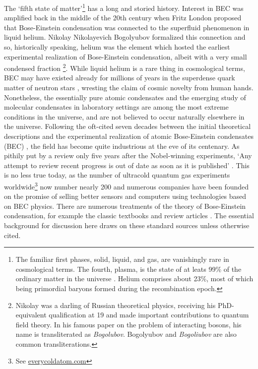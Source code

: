 	The `fifth state of matter'\footnote{The familiar first phases, solid, liquid, and gas, are vanishingly rare in cosmological terms.
	The fourth, plasma, is the state of at leats 99\% of the ordinary matter in the universe \cite{Plasmastuff}.
	Helium comprises about 23\%, most of which being primordial baryons formed during the recombination epoch.}  has a long and storied history\cite{Mukundanote}.
	Interest in BEC was amplified back in the middle of the 20th century when Fritz London proposed that Bose-Einstein condensation was connected to the superfluid phenomenon in liquid helium.
	Nikolay Nikolayevich Bogolyubov formalized this connection and so, historically speaking, helium was the element which hosted the earliest experimental realization of Bose-Einstein condensation, albeit with a very small condensed fraction \footnote{Nikolay was a darling of Russian theoretical physics, receiving his PhD-equivalent qualification at 19 and made important contributions to quantum field theory. In his famous paper on the problem of interacting bosons, his name is transliterated as \emph{Bogolubov}. Bogolyubov and \emph{Bogoliubov} are also common transliterations.}.
	While liquid helium is a rare thing in cosmological terms, BEC may have existed already for millions of years in the superdense quark matter of neutron stars \cite{Haskell18, Martin16,Baym69,Page11}, wresting the claim of cosmic novelty from human hands. 
	Nonetheless, the essentially pure atomic condensates and the emerging study of molecular condensates in laboratory settings are among the most extreme conditions in the universe, and are not believed to occur naturally elsewhere in the universe.
	Following the oft-cited seven decades between the initial theoretical descriptions and the experimental realization of atomic Bose-Einstein condensates (BEC) \cite{Davis95,Bradley95,Anderson95}, the field has become quite industrious at the eve of its centenary.
	As pithily put by a review only five years after the Nobel-winning experiments, `Any attempt to review recent progress is out of date as soon as it is published' \cite{Courteille01}.
	This is no less true today, as the number of ultracold quantum gas experiments worldwide\footnote{See \url{everycoldatom.com}} now number nearly 200 and numerous companies have been founded on the promise of selling better sensors and computers using technologies based on BEC physics.
	There are numerous treatments of the theory of Bose-Einstein condensation, for example the classic textbooks \cite{PitaevskiiStringari,PethickSmith} and review articles \cite{DalfovoReview, Yukalov11_basics,Courteille01}.
	The essential background for discussion here draws on these standard sources unless otherwise cited.


